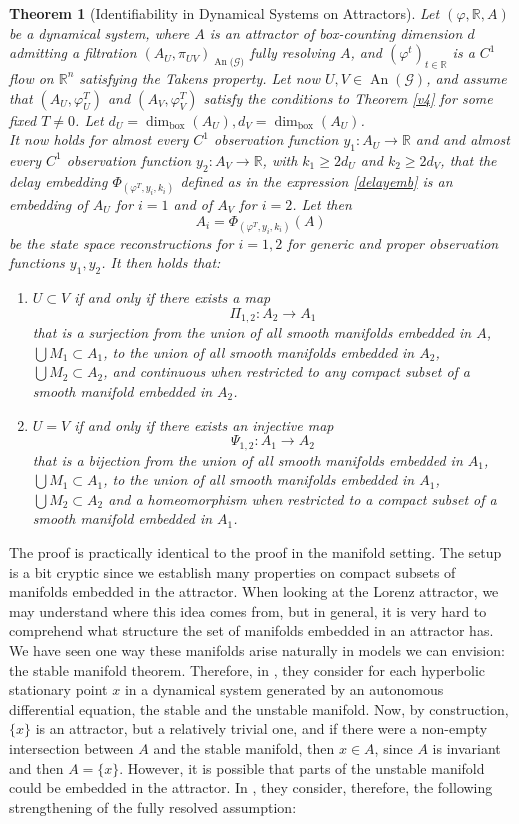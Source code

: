\documentclass[11pt, a4paper]{memoir}
\theoremstyle{break}
\newtheorem{thm}{Theorem}
\theoremstyle{break}
\theoremstyle{nonumberplain}
\newcommand{\mR}{\mathbb{R}}
\DeclareMathOperator{\an}{An}
\begin{document}
\begin{thm}[Identifiability in Dynamical Systems on Attractors]\label{id2}
Let $(\varphi, \mR,A)$ be a dynamical system, where $A$ is an attractor of box-counting dimension $d$ admitting a filtration $(A_U,\pi_{UV})_{\an(\mathcal{G)}}$ fully resolving $A$, and $(\varphi^t)_{t\in \mR}$ is a $C^1$ flow on $\mR^n$ satisfying the Takens property. Let now $U,V\in\an( \mathcal{G})$, and assume that $(A_U,\varphi_U^T)$ and $(A_V,\varphi_V^T)$ satisfy the conditions to Theorem \ref{v4} for some fixed $T\neq 0$. Let $d_U=\dim_{\text{box}}(A_U), d_V=\dim_{\text{box}}(A_U)$.\\
It now holds for almost every $C^1$ observation function $y_1:A_U\to\mR$ and and almost every $C^1$ observation function $y_2:A_V\to \mR$, with $k_1\geqslant 2d_U$ and $k_2\geqslant 2d_V$, that the delay embedding $\Phi_{(\varphi^T,y_i,k_i)}$ defined as in the expression \ref{delayemb} is an embedding of $A_U$ for $i=1$ and of $A_V$ for $i=2$. Let then 
$$A_i=\Phi_{(\varphi^T,y_i,k_i)}(A)$$ 
be the state space reconstructions for $i=1,2$ for generic and proper observation functions $y_1,y_2$. It then holds that:
\begin{enumerate}[label=(\roman*)]
	\item $U\subset V$ if and only if there exists a map
	$$\Pi_{1,2}:A_2\to A_1$$ 
	that is a surjection from the union of all smooth manifolds embedded in $A$, $\bigcup M_1\subset A_1$, to the union of all smooth manifolds embedded in $A_2$, $\bigcup M_2\subset A_2$, and continuous when restricted to any compact subset of a smooth manifold embedded in $A_2$.
	\item $U=V$ if and only if there exists  an injective map
	$$\Psi_{1,2}:A_1\to A_2$$
	that is a bijection from the union of all smooth manifolds embedded in $A_1$, $\bigcup M_1\subset A_1$, to the union of all smooth manifolds embedded in $A_1$, $\bigcup M_2\subset A_2$ and a homeomorphism when restricted to a compact subset of a smooth manifold embedded in $A_1$.
\end{enumerate}
\end{thm}
The proof is practically identical to the proof in the manifold setting. The setup is a bit cryptic since we establish many properties on compact subsets of manifolds embedded in the attractor. When looking at the Lorenz attractor, we may understand where this idea comes from, but in general, it is very hard to comprehend what structure the set of manifolds embedded in an attractor has. We have seen one way these manifolds arise naturally in models we can envision: the stable manifold theorem. Therefore, in \cite{mathFound}, they consider for each hyperbolic stationary point $x$ in a dynamical system generated by an autonomous differential equation, the stable and the unstable manifold. Now, by construction, $\{x\}$ is an attractor, but a relatively trivial one, and if there were a non-empty intersection between $A$ and the stable manifold, then $x\in A$, since $A$ is invariant and then $A=\{x\}$. However, it is possible that parts of the unstable manifold could be embedded in the attractor. In \cite{mathFound}, they consider, therefore, the following strengthening of the fully resolved assumption:
\end{document}
